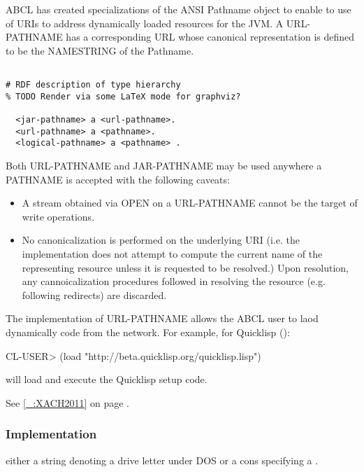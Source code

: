 \documentclass[10pt]{book}
\begin{document}
ABCL has created specializations of the ANSI Pathname object to
enable to use of URIs to address dynamically loaded resources for the
JVM.  A URL-PATHNAME has a corresponding URL whose canonical
representation is defined to be the NAMESTRING of the Pathname.

%
\begin{verbatim}

# RDF description of type hierarchy 
% TODO Render via some LaTeX mode for graphviz?

  <jar-pathname> a <url-pathname>.
  <url-pathname> a <pathname>.
  <logical-pathname> a <pathname> .
\end{verbatim}

Both URL-PATHNAME and JAR-PATHNAME may be used anywhere a PATHNAME is
accepted with the following caveats:

\begin{itemize}

\item A stream obtained via OPEN on a URL-PATHNAME cannot be the
  target of write operations.

\item No canonicalization is performed on the underlying URI (i.e. the
implementation does not attempt to compute the current name of the
representing resource unless it is requested to be resolved.)  Upon
resolution, any cannoicalization procedures followed in resolving the
resource (e.g. following redirects) are discarded.  

\end{itemize}

The implementation of URL-PATHNAME allows the ABCL user to laod dynamically
code from the network.  For example, for Quicklisp (\cite{Xach2011}):

\begin{listing-lisp}
  CL-USER> (load "http://beta.quicklisp.org/quicklisp.lisp")
\end{listing-lisp}

will load and execute the Quicklisp setup code.

See \ref{_:XACH2011} on page \pageref{_:XACH2011}.

\subsubsection{Implementation}

 either a string denoting a drive letter under DOS or a cons
specifying a .
         
\end{document}
